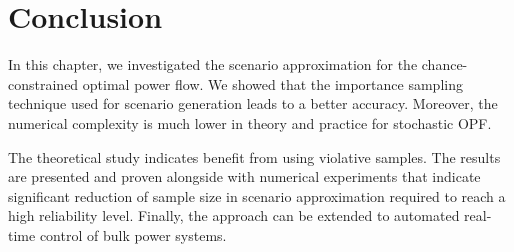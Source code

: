 \section{Conclusion}
\label{sec:conclusion}
In this chapter, we investigated the scenario approximation for the chance-constrained optimal power flow. We showed that the importance sampling technique used for scenario generation leads to a better accuracy. Moreover, the numerical complexity is much lower in theory and practice for stochastic OPF. 

The theoretical study indicates benefit from using violative samples. The results are presented and proven alongside with numerical experiments that indicate significant reduction of sample size in scenario approximation required to reach a high reliability level. Finally, the approach can be extended to automated real-time control of bulk power systems. 